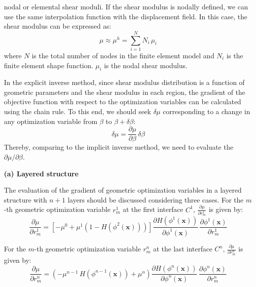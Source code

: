 \documentclass[11pt]{article}
\begin{document}
\noindent
nodal or elemental shear moduli. If the shear modulus is nodally
defined, we can use the same interpolation function with the
displacement field. In this case, the shear modulus can be expressed
as:
\begin{equation}
\mu \approx \mu^{h} = \sum_{i=1}^{N} N_i\, \mu_i
\end{equation}
where $N$ is the total number of nodes in the finite element model
and $N_i$ is the finite element shape function. $\mu_i$ is the nodal
shear modulus.

In the explicit inverse method, since shear modulus distribution is a
function of geometric parameters and the shear modulus in each
region, the gradient of the objective function with respect to the
optimization variables can be calculated using the chain rule. To
this end, we should seek $\delta\mu$ corresponding to a change in any
optimization variable from $\beta$ to $\beta + \delta\beta$:
\begin{equation}
\delta\mu = \frac{\partial\mu}{\partial\beta}\,\delta\beta
\end{equation}
Thereby, comparing to the implicit inverse method, we need to
evaluate the $\partial\mu / \partial\beta$.

\medskip
\noindent
\textbf{(a) Layered structure}

\medskip
\noindent
The evaluation of the gradient of geometric optimization variables in
a layered structure with $n + 1$ layers should be discussed
considering three cases. For the $m$-th geometric optimization
variable $r^{1}_{m}$ at the first interface $C^{1}$,
$\frac{\partial\mu}{\partial r^{1}_{m}}$ is given by:
\begin{equation}
\frac{\partial\mu}{\partial r^{1}_{m}}
= \left[-\mu^{0} + \mu^{1}\!\left(1 - H\!\left(\phi^{2}(\mathbf{x})\right)\right)\right]
  \frac{\partial H\!\left(\phi^{1}(\mathbf{x})\right)}{\partial\phi^{1}(\mathbf{x})}\,
  \frac{\partial\phi^{1}(\mathbf{x})}{\partial r^{1}_{m}}
\end{equation}

For the $m$-th geometric optimization variable $r^{n}_{m}$ at the
last interface $C^{n}$,
$\frac{\partial\mu}{\partial r^{n}_{m}}$ is given by:
\begin{equation}
\frac{\partial\mu}{\partial r^{n}_{m}}
= \left(-\mu^{n-1}\, H\!\left(\phi^{n-1}(\mathbf{x})\right) + \mu^{n}\right)
  \frac{\partial H\!\left(\phi^{n}(\mathbf{x})\right)}{\partial\phi^{n}(\mathbf{x})}\,
  \frac{\partial\phi^{n}(\mathbf{x})}{\partial r^{n}_{m}}
\end{equation}
\end{document}
